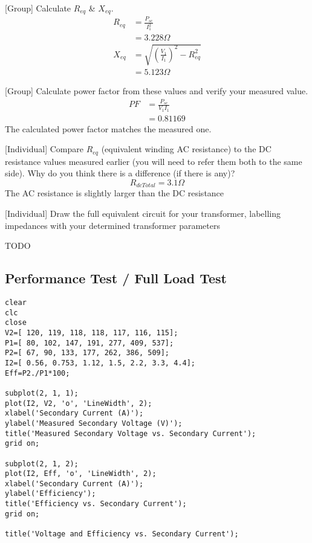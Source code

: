 \documentclass[11pt]{article}
\begin{document}
{[}Group] Calculate \(R_{eq}\) \& \(X_{eq}\).
\begin{align*}
R_{eq}&=\frac{P_{sc}}{I_1^2} \\
&=3.228\Omega \\
X_{eq}&=\sqrt{\left(\frac{V_1}{I_1}\right)^2-R_{eq}^{2}} \\
&=5.123\Omega
\end{align*}

{[}Group] Calculate power factor from these values and verify your measured value.
\begin{align*}
PF&=\frac{P_{sc}}{V_1I_1} \\
&=0.81169
\end{align*}
The calculated power factor matches the measured one.

{[}Individual] Compare \(R_{eq}\) (equivalent winding AC resistance) to the DC resistance values measured earlier (you will need to refer them both to the same side). Why do you think there is a difference (if there is any)?
\[R_{dcTotal}=3.1\Omega\]
The AC resistance is slightly larger than the DC resistance

{[}Individual] Draw the full equivalent circuit for your transformer, labelling impedances with your determined transformer parameters

TODO
\subsection{Performance Test / Full Load Test}
\label{sec:orgcdc0280}
\begin{verbatim}
clear
clc
close
V2=[ 120, 119, 118, 118, 117, 116, 115];
P1=[ 80, 102, 147, 191, 277, 409, 537];
P2=[ 67, 90, 133, 177, 262, 386, 509];
I2=[ 0.56, 0.753, 1.12, 1.5, 2.2, 3.3, 4.4];
Eff=P2./P1*100;

subplot(2, 1, 1);
plot(I2, V2, 'o', 'LineWidth', 2);
xlabel('Secondary Current (A)');
ylabel('Measured Secondary Voltage (V)');
title('Measured Secondary Voltage vs. Secondary Current');
grid on;

subplot(2, 1, 2);
plot(I2, Eff, 'o', 'LineWidth', 2);
xlabel('Secondary Current (A)');
ylabel('Efficiency');
title('Efficiency vs. Secondary Current');
grid on;

title('Voltage and Efficiency vs. Secondary Current');
\end{verbatim}
\end{document}
